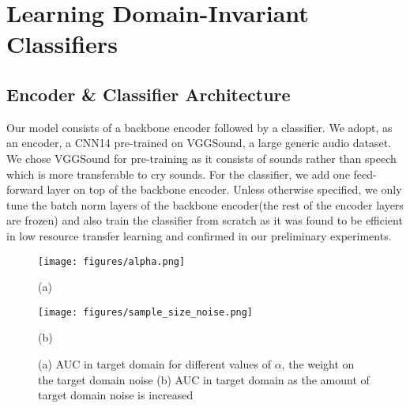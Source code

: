 \documentclass{article}
\begin{document}

\section{Learning Domain-Invariant Classifiers}

\subsection{Encoder \& Classifier Architecture}
Our model consists of a backbone encoder followed by a classifier. We adopt, as an encoder, a CNN14 \cite{kong2020panns} pre-trained on VGGSound\cite{chen2020vggsound}, a large generic audio dataset. We chose VGGSound for pre-training as it consists of sounds rather than speech which is more transferable to cry sounds. For the classifier, we add one feed-forward layer on top of the backbone encoder. Unless otherwise specified, we only tune the batch norm layers of the backbone encoder(the rest of the encoder layers are frozen) and also train the classifier from scratch as it was found to be efficient in low resource transfer learning\cite{gorin2023selfsupervised} and confirmed in our preliminary experiments.

\begin{figure*}[h]
\begin{minipage}[b]{0.5\textwidth}
  \centering
  \centerline{\texttt{[image: figures/alpha.png]}}
    \centerline{(a)}\medskip
  \label{fig:3a}
\end{minipage}
\begin{minipage}[b]{0.5\textwidth}
  \centering
  \centerline{\texttt{[image: figures/sample\_size\_noise.png]}}
  \centerline{(b)}\medskip
  \label{fig:3b}
\end{minipage}
\caption{(a) AUC in target domain for different values of $\alpha$, the weight on the target domain noise (b) AUC in target domain as the amount of target domain noise is increased}
\label{fig:noise_sample_size}
\end{figure*}
\end{document}
